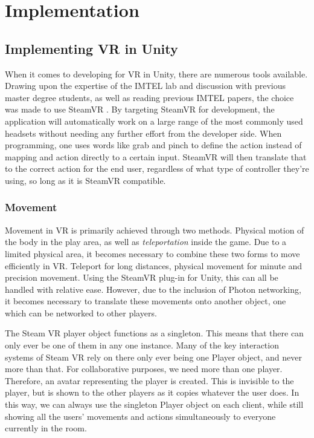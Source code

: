 \section{Implementation}

\subsection{Implementing VR in Unity}
When it comes to developing for VR in Unity, there are numerous tools available. Drawing upon the expertise of the IMTEL lab and discussion with previous master degree students, as well as reading previous IMTEL papers, the choice was made to use SteamVR \cite{steamVR}\cite{steamVRAPI}. By targeting SteamVR for development, the application will automatically work on a large range of the most commonly used headsets without needing any further effort from the developer side. When programming, one uses words like grab and pinch to define the action instead of mapping and action directly to a certain input. SteamVR will then translate that to the correct action for the end user, regardless of what type of controller they're using, so long as it is SteamVR compatible.

\subsubsection{Movement}
Movement in VR is primarily achieved through two methods. Physical motion of the body in the play area, as well as \textit{teleportation} inside the game. Due to a limited physical area, it becomes necessary to combine these two forms to move efficiently in VR. Teleport for long distances, physical movement for minute and precision movement. Using the SteamVR plug-in for Unity\cite{steamVRAPI}, this can all be handled with relative ease. However, due to the inclusion of Photon networking, it becomes necessary to translate these movements onto another object, one which can be networked to other players. 

The Steam VR player object functions as a singleton. This means that there can only ever be one of them in any one instance. Many of the key interaction systems of Steam VR rely on there only ever being one Player object, and never more than that. For collaborative purposes, we need more than one player. Therefore, an avatar representing the player is created. This is invisible to the player, but is shown to the other players as it copies whatever the user does. In this way, we can always use the singleton Player object on each client, while still showing all the users' movements and actions simultaneously to everyone currently in the room. 

